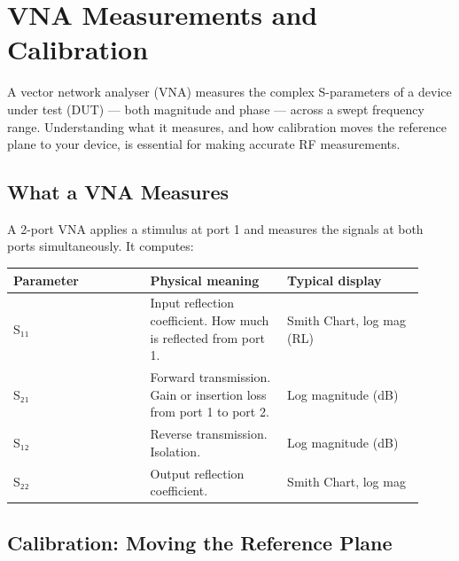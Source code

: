 \section{VNA Measurements and Calibration}\label{sec:wiki_vna}



A vector network analyser (VNA) measures the complex S-parameters of a device under test (DUT) — both magnitude and phase — across a swept frequency range. Understanding what it measures, and how calibration moves the reference plane to your device, is essential for making accurate RF measurements.

      

\subsection{What a VNA Measures}

      

A 2-port VNA applies a stimulus at port 1 and measures the signals at both ports simultaneously. It computes:


      
        
        
        
        
        
      

{\small\begin{longtable}{>{\raggedright\arraybackslash}p{0.307\linewidth}>{\raggedright\arraybackslash}p{0.307\linewidth}>{\raggedright\arraybackslash}p{0.307\linewidth}}
\hline
\textbf{Parameter} & \textbf{Physical meaning} & \textbf{Typical display} \\
\hline
S₁₁ & Input reflection coefficient. How much is reflected from port 1. & Smith Chart, log mag (RL) \\
S₂₁ & Forward transmission. Gain or insertion loss from port 1 to port 2. & Log magnitude (dB) \\
S₁₂ & Reverse transmission. Isolation. & Log magnitude (dB) \\
S₂₂ & Output reflection coefficient. & Smith Chart, log mag \\
\hline
\end{longtable}}

      

\subsection{Calibration: Moving the Reference Plane}

